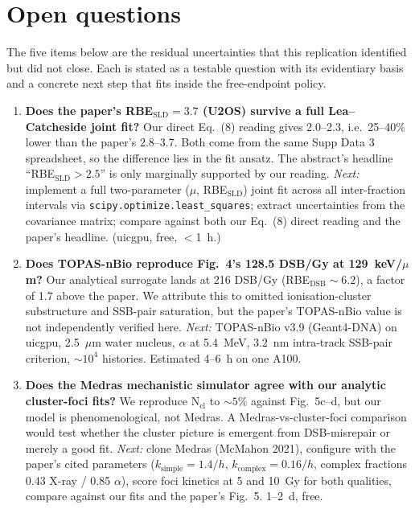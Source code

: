 \section{Open questions}

The five items below are the residual uncertainties that this replication
identified but did not close. Each is stated as a testable question with
its evidentiary basis and a concrete next step that fits inside the
free-endpoint policy.

\begin{enumerate}
\item \textbf{Does the paper's RBE$_{\text{SLD}} = 3.7$ (U2OS) survive a
full Lea--Catcheside joint fit?}
Our direct Eq.~(8) reading gives 2.0--2.3, i.e.\ 25--40\% lower than the
paper's 2.8--3.7. Both come from the same Supp Data 3 spreadsheet, so the
difference lies in the fit ansatz. The abstract's headline
``RBE$_{\text{SLD}} > 2.5$'' is only marginally supported by our reading.
\emph{Next:} implement a full two-parameter ($\mu$, RBE$_{\text{SLD}}$)
joint fit across all inter-fraction intervals via
\texttt{scipy.optimize.least\_squares}; extract uncertainties from the
covariance matrix; compare against both our Eq.~(8) direct reading and
the paper's headline. (uicgpu, free, $<$1~h.)

\item \textbf{Does TOPAS-nBio reproduce Fig.~4's 128.5 DSB/Gy at
129~keV/$\mu$m?}
Our analytical surrogate lands at 216 DSB/Gy (RBE$_{\text{DSB}} \sim
6.2$), a factor of 1.7 above the paper. We attribute this to omitted
ionisation-cluster substructure and SSB-pair saturation, but the paper's
TOPAS-nBio value is not independently verified here.
\emph{Next:} TOPAS-nBio v3.9 (Geant4-DNA) on uicgpu, 2.5~$\mu$m water
nucleus, $\alpha$ at 5.4~MeV, 3.2~nm intra-track SSB-pair criterion,
$\sim 10^4$ histories. Estimated 4--6~h on one A100.

\item \textbf{Does the Medras mechanistic simulator agree with our
analytic cluster-foci fits?}
We reproduce N$_{\text{cl}}$ to $\sim 5\%$ against Fig.~5c--d, but our
model is phenomenological, not Medras. A Medras-vs-cluster-foci
comparison would test whether the cluster picture is emergent from
DSB-misrepair or merely a good fit.
\emph{Next:} clone Medras (McMahon 2021), configure with the paper's
cited parameters ($k_{\text{simple}} = 1.4/h$, $k_{\text{complex}} =
0.16/h$, complex fractions 0.43 X-ray / 0.85 $\alpha$), score foci
kinetics at 5 and 10~Gy for both qualities, compare against our fits and
the paper's Fig.~5. 1--2~d, free.


\end{enumerate}
